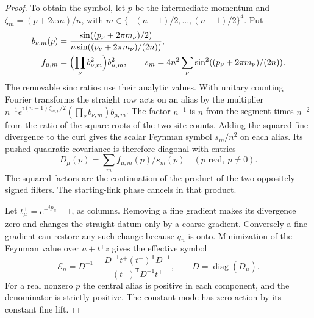 \documentclass[11pt,letterpaper,reqno]{amsart}
\numberwithin{equation}{section}
\theoremstyle{definition}
\theoremstyle{remark}
\begin{document}
\begin{proof}
To obtain the symbol, let \(p\) be the intermediate momentum
and \(\zeta_m=(p+2\pi m)/n\), with
\(m\in\{-(n-1)/2,\ldots,(n-1)/2\}^4\). Put
\[
 \begin{aligned}
 b_{\nu,m}(p)&=\frac{\sin((p_\nu+2\pi m_\nu)/2)}
                   {n\sin((p_\nu+2\pi m_\nu)/(2n))},\\
 f_{\mu,m}&=\Bigl(\prod_\nu b_{\nu,m}^2\Bigr)b_{\mu,m}^2,\qquad
 s_m=4n^2\sum_\nu\sin^2((p_\nu+2\pi m_\nu)/(2n)).
 \end{aligned}
\]
The removable sinc ratios use their analytic values.
With unitary counting Fourier transforms the straight row
acts on an alias by the multiplier
\(n^{-1}e^{i(n-1)\zeta_{m,\mu}/2}
(\prod_\nu b_{\nu,m})b_{\mu,m}\).
The factor \(n^{-1}\) is \(n\) from the segment times \(n^{-2}\)
from the ratio of the square roots of the two site counts.
Adding the squared fine divergence to the curl gives the
scalar Feynman symbol \(s_m/n^2\) on each alias. Its pushed
quadratic covariance is therefore diagonal with entries
\[
 D_\mu(p)=\sum_m f_{\mu,m}(p)/s_m(p)
 \quad(p\text{ real},\ p\ne0).
\]
The squared factors are the continuation of the product of the
two oppositely signed filters. The starting-link phase cancels
in that product.

Let \(t^\pm_\mu=e^{\pm ip_\mu}-1\), as columns. Removing a fine
gradient makes its divergence zero and changes the straight
datum only by a coarse gradient. Conversely a fine gradient can
restore any such change because \(q_n\) is onto. Minimization
of the Feynman value over \(a+t^+z\) gives the effective symbol
\begin{equation}\label{mb:eq-flat-symbol}
 \mathcal E_n
  = D^{-1}
    -\frac{D^{-1}t^+(t^-)^{\mathsf T}D^{-1}}
                 {(t^-)^{\mathsf T}D^{-1}t^+},
 \qquad D=\operatorname{diag}(D_\mu).
\end{equation}
For a real nonzero \(p\) the central alias is positive in each
component, and the denominator is strictly positive.
The constant mode has zero action by its constant fine lift.


\end{proof}
\end{document}
